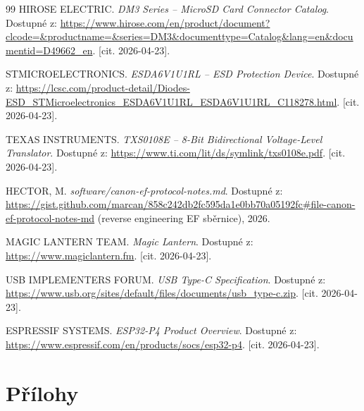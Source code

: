 \documentclass[12pt, a4paper, oneside]{report}
\begin{document}
\begin{thebibliography}{99}
 HIROSE ELECTRIC. \textit{DM3 Series -- MicroSD Card Connector Catalog}. Dostupné z: \url{https://www.hirose.com/en/product/document?clcode=&productname=&series=DM3&documenttype=Catalog&lang=en&documentid=D49662_en}. [cit. 2026-04-23].

 STMICROELECTRONICS. \textit{ESDA6V1U1RL -- ESD Protection Device}. Dostupné z: \url{https://lcsc.com/product-detail/Diodes-ESD_STMicroelectronics_ESDA6V1U1RL_ESDA6V1U1RL_C118278.html}. [cit. 2026-04-23].

 TEXAS INSTRUMENTS. \textit{TXS0108E -- 8-Bit Bidirectional Voltage-Level Translator}. Dostupné z: \url{https://www.ti.com/lit/ds/symlink/txs0108e.pdf}. [cit. 2026-04-23].

 HECTOR, M. \textit{software/canon-ef-protocol-notes.md}. Dostupné z: \url{https://gist.github.com/marcan/858c242db2fc595da1e0bb70a05192fc#file-canon-ef-protocol-notes-md} (reverse engineering EF sběrnice), 2026.

 MAGIC LANTERN TEAM. \textit{Magic Lantern}. Dostupné z: \url{https://www.magiclantern.fm}. [cit. 2026-04-23].

 USB IMPLEMENTERS FORUM. \textit{USB Type-C Specification}. Dostupné z: \url{https://www.usb.org/sites/default/files/documents/usb_type-c.zip}. [cit. 2026-04-23].

 ESPRESSIF SYSTEMS. \textit{ESP32-P4 Product Overview}. Dostupné z: \url{https://www.espressif.com/en/products/socs/esp32-p4}. [cit. 2026-04-23].


\end{thebibliography}

\chapter*{Přílohy}
\end{document}
